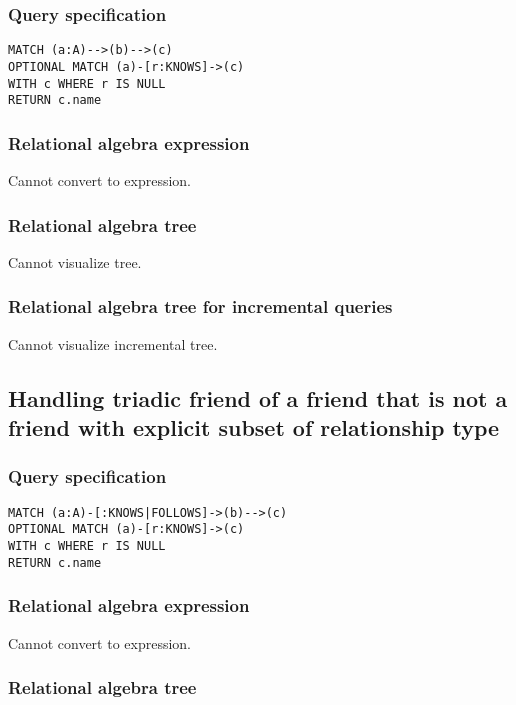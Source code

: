 \subsubsection*{Query specification}

\begin{lstlisting}
MATCH (a:A)-->(b)-->(c)
OPTIONAL MATCH (a)-[r:KNOWS]->(c)
WITH c WHERE r IS NULL
RETURN c.name
\end{lstlisting}

\subsubsection*{Relational algebra expression}

Cannot convert to expression.

\subsubsection*{Relational algebra tree}

Cannot visualize tree.

\subsubsection*{Relational algebra tree for incremental queries}

Cannot visualize incremental tree.

\subsection{Handling triadic friend of a friend that is not a friend with explicit subset of relationship type}

\subsubsection*{Query specification}

\begin{lstlisting}
MATCH (a:A)-[:KNOWS|FOLLOWS]->(b)-->(c)
OPTIONAL MATCH (a)-[r:KNOWS]->(c)
WITH c WHERE r IS NULL
RETURN c.name
\end{lstlisting}

\subsubsection*{Relational algebra expression}

Cannot convert to expression.

\subsubsection*{Relational algebra tree}

